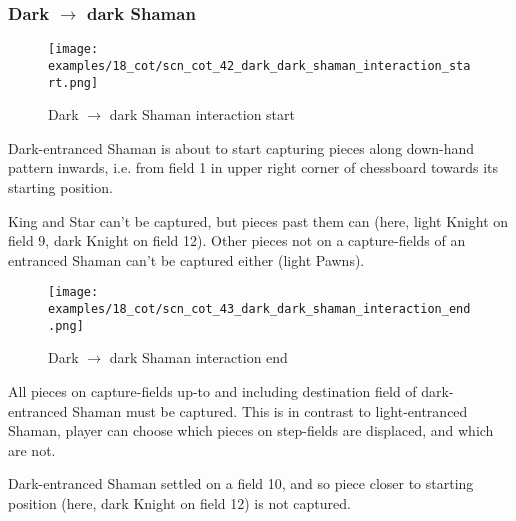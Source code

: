 \subsubsection*{Dark $\rightarrow$ dark Shaman}
\label{sec:Conquest of Tlalocan/Trance-journey/Interactions/Dark --> dark Shaman}

\vspace*{-1.5\baselineskip}
\noindent
\begin{figure}[!h]
\texttt{[image: examples/18\_cot/scn\_cot\_42\_dark\_dark\_shaman\_interaction\_start.png]}
\vspace*{-1.4\baselineskip}
\caption{Dark $\rightarrow$ dark Shaman interaction start}
\label{fig:scn_cot_42_dark_dark_shaman_interaction_start}
\end{figure}

\vspace*{-0.5\baselineskip}
Dark-entranced Shaman is about to start capturing pieces along down-hand pattern
inwards, i.e. from field 1 in upper right corner of chessboard towards its starting
position.

King and Star can't be captured, but pieces past them can (here, light Knight on
field 9, dark Knight on field 12). Other pieces not on a capture-fields of an
entranced Shaman can't be captured either (light Pawns).

\clearpage %

\noindent
\begin{figure}[!h]
\texttt{[image: examples/18\_cot/scn\_cot\_43\_dark\_dark\_shaman\_interaction\_end.png]}
\caption{Dark $\rightarrow$ dark Shaman interaction end}
\label{fig:scn_cot_43_dark_dark_shaman_interaction_end}
\end{figure}

All pieces on capture-fields up-to and including destination field of dark-entranced
Shaman must be captured. This is in contrast to light-entranced Shaman, player can
choose which pieces on step-fields are displaced, and which are not.

Dark-entranced Shaman settled on a field 10, and so piece closer to starting position
(here, dark Knight on field 12) is not captured.

\clearpage %

